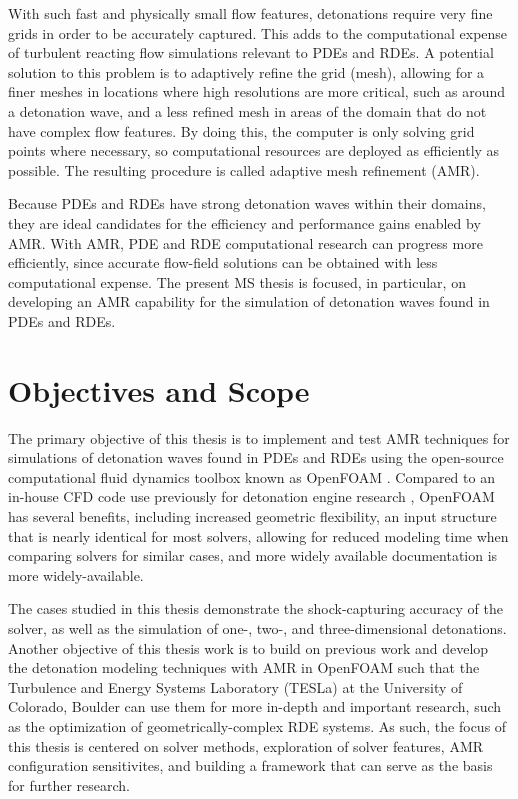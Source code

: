 With such fast and physically small flow features, detonations require very fine grids in order to be accurately captured. This adds to the computational expense of turbulent reacting flow simulations relevant to PDEs and RDEs. A potential solution to this problem is to adaptively refine the grid (mesh), allowing for a finer meshes in locations where high resolutions are more critical, such as around a detonation wave, and a less refined mesh in areas of the domain that do not have complex flow features. By doing this, the computer is only solving grid points where necessary, so computational resources are deployed as efficiently as possible. The resulting procedure is called adaptive mesh refinement (AMR). 

Because PDEs and RDEs have strong detonation waves within their domains, they are ideal candidates for the efficiency and performance gains enabled by AMR. With AMR, PDE and RDE computational research can progress more efficiently, since accurate flow-field solutions can be obtained with less computational expense. The present MS thesis is focused, in particular, on developing an AMR capability for the simulation of detonation waves found in PDEs and RDEs.

\section{Objectives and Scope}
The primary objective of this thesis is to implement and test AMR techniques for simulations of detonation waves found in PDEs and RDEs using the open-source computational fluid dynamics toolbox known as OpenFOAM \cite{weller}. Compared to an in-house CFD code use previously for detonation engine research \cite{towery1}, OpenFOAM has several benefits, including increased geometric flexibility, an input structure that is nearly identical for most solvers, allowing for reduced modeling time when comparing solvers for similar cases, and more widely available documentation is more widely-available.

The cases studied in this thesis demonstrate the shock-capturing accuracy of the solver, as well as the simulation of one-, two-, and three-dimensional detonations. Another objective of this thesis work is to build on previous work \cite{towery1} and develop the detonation modeling techniques with AMR in OpenFOAM such that the Turbulence and Energy Systems Laboratory (TESLa) at the University of Colorado, Boulder can use them for more in-depth and important research, such as the optimization of geometrically-complex RDE systems. As such, the focus of this thesis is centered on solver methods, exploration of solver features, AMR configuration sensitivites, and building a framework that can serve as the basis for further research. 

